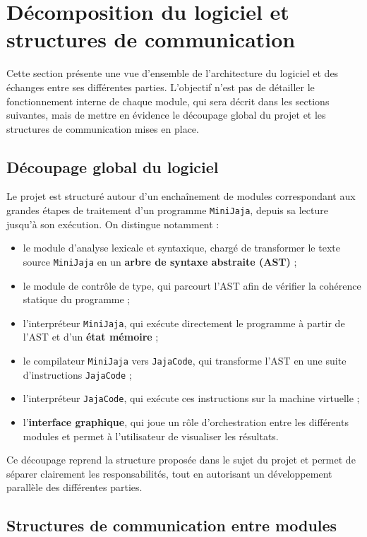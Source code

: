 
\section{Décomposition du logiciel et structures de communication}

Cette section présente une vue d’ensemble de l’architecture du logiciel et des échanges entre ses différentes parties. L’objectif n’est pas de détailler le fonctionnement interne de chaque module, qui sera décrit dans les sections suivantes, mais de mettre en évidence le découpage global du projet et les structures de communication mises en place.

\subsection{Découpage global du logiciel}

Le projet est structuré autour d’un enchaînement de modules correspondant aux grandes étapes de traitement d’un programme \texttt{MiniJaja}, depuis sa lecture jusqu’à son exécution. On distingue notamment :
\begin{itemize}
    \item le module d’analyse lexicale et syntaxique, chargé de transformer le texte source \texttt{MiniJaja} en un \textbf{arbre de syntaxe abstraite (AST)} ;
    \item le module de contrôle de type, qui parcourt l’AST afin de vérifier la cohérence statique du programme ;
    \item l’interpréteur \texttt{MiniJaja}, qui exécute directement le programme à partir de l’AST et d’un \textbf{état mémoire} ;
    \item le compilateur \texttt{MiniJaja} vers \texttt{JajaCode}, qui transforme l’AST en une suite d’instructions \texttt{JajaCode} ;
    \item l’interpréteur \texttt{JajaCode}, qui exécute ces instructions sur la machine virtuelle ;
    \item l’\textbf{interface graphique}, qui joue un rôle d’orchestration entre les différents modules et permet à l’utilisateur de visualiser les résultats.
\end{itemize}
\vspace{0.5cm}
Ce découpage reprend la structure proposée dans le sujet du projet et permet de séparer clairement les responsabilités, tout en autorisant un développement parallèle des différentes parties.

\subsection{Structures de communication entre modules}


